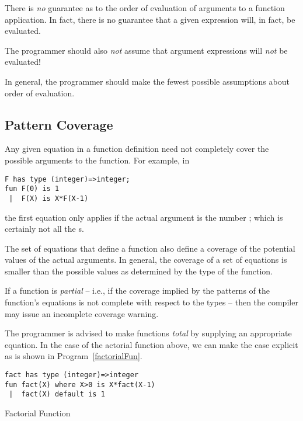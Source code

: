 There is \emph{no} guarantee as to the order of evaluation of arguments to a function application. In fact, there is no guarantee that a given expression will, in fact, be evaluated.

\begin{aside}
The programmer should also \emph{not} assume that argument expressions will \emph{not} be evaluated!

In general, the programmer should make the fewest possible assumptions about order of evaluation.
\end{aside}

\subsection{Pattern Coverage}
\label{patternCoverage}
Any given equation in a function definition need not completely cover the possible arguments to the function. For example, in
\begin{lstlisting}
F has type (integer)=>integer;
fun F(0) is 1
 |  F(X) is X*F(X-1)
\end{lstlisting}
the first equation only applies if the actual argument is the number ; which is certainly not all the s.

The set of equations that define a function also define a coverage of the potential values of the actual arguments. In general, the coverage of a set of equations is smaller than the possible values as determined by the type of the function.

If a function is \emph{partial} -- i.e., if the coverage implied by the patterns of the function's equations is not complete with respect to the types -- then the compiler may issue an incomplete coverage warning.

\begin{aside}
The programmer is advised to make functions \emph{total} by supplying an appropriate  equation. In the case of the actorial function above, we can make the  case explicit as is shown in Program~\vref{factorialFun}.
\end{aside}

\begin{program}
\begin{lstlisting}
fact has type (integer)=>integer
fun fact(X) where X>0 is X*fact(X-1)
 |  fact(X) default is 1
\end{lstlisting}
\caption{Factorial Function\label{factorialFun}}
\end{program}

